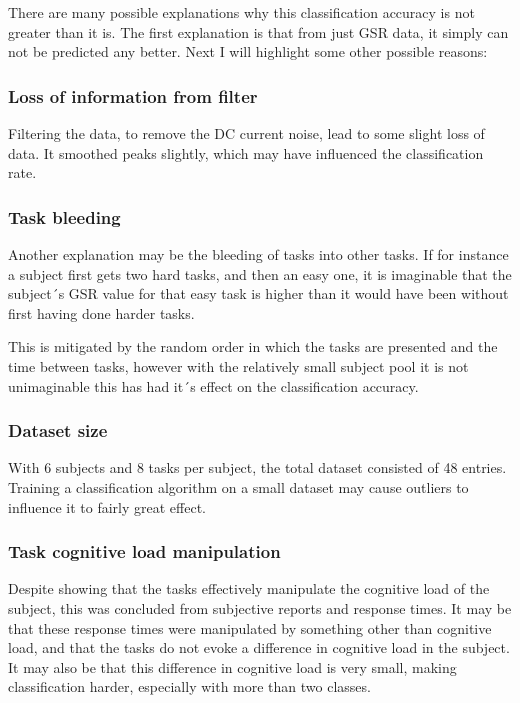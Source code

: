 \documentclass[11pt,leqno,letterpaper]{report} %
\begin{document}
There are many possible explanations why this classification accuracy is not greater than it is. The first explanation is that from just GSR data, it simply can not be predicted any better. Next I will highlight some other possible reasons:

\subsubsection{Loss of information from filter}
Filtering the data, to remove the DC current noise, lead to some slight loss of data. It smoothed peaks slightly, which may have influenced the classification rate.


\subsubsection{Task bleeding}
Another explanation may be the bleeding of tasks into other tasks. If for instance a subject first gets two hard tasks, and then an easy one, it is imaginable that the subject´s GSR value for that easy task is higher than it would have been without first having done harder tasks. 

This is mitigated by the random order in which the tasks are presented and the time between tasks, however with the relatively small subject pool it is not unimaginable this has had it´s effect on the classification accuracy.

\subsubsection{Dataset size}
With 6 subjects and 8 tasks per subject, the total dataset consisted of 48 entries. Training a classification algorithm on a small dataset may cause outliers to influence it to fairly great effect.

\subsubsection{Task cognitive load manipulation}
Despite \citep{Nourbakhsh2013} showing that the tasks effectively manipulate the cognitive load of the subject, this was concluded from subjective reports and response times. It may be that these response times were manipulated by something other than cognitive load, and that the tasks do not evoke a difference in cognitive load in the subject. It may also be that this difference in cognitive load is very small, making classification harder, especially with more than two classes.
\end{document}
